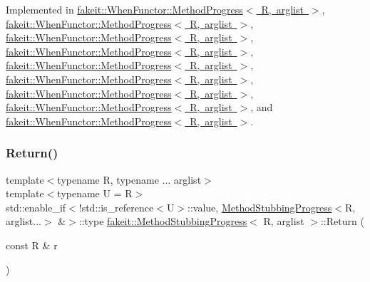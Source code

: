 Implemented in \mbox{\hyperlink{structfakeit_1_1WhenFunctor_1_1MethodProgress_a4b8a947b1514fe715743ee8e65953d9d}{fakeit\+::\+When\+Functor\+::\+Method\+Progress$<$ R, arglist $>$}}, \mbox{\hyperlink{structfakeit_1_1WhenFunctor_1_1MethodProgress_a4b8a947b1514fe715743ee8e65953d9d}{fakeit\+::\+When\+Functor\+::\+Method\+Progress$<$ R, arglist $>$}}, \mbox{\hyperlink{structfakeit_1_1WhenFunctor_1_1MethodProgress_a4b8a947b1514fe715743ee8e65953d9d}{fakeit\+::\+When\+Functor\+::\+Method\+Progress$<$ R, arglist $>$}}, \mbox{\hyperlink{structfakeit_1_1WhenFunctor_1_1MethodProgress_a4b8a947b1514fe715743ee8e65953d9d}{fakeit\+::\+When\+Functor\+::\+Method\+Progress$<$ R, arglist $>$}}, \mbox{\hyperlink{structfakeit_1_1WhenFunctor_1_1MethodProgress_a4b8a947b1514fe715743ee8e65953d9d}{fakeit\+::\+When\+Functor\+::\+Method\+Progress$<$ R, arglist $>$}}, \mbox{\hyperlink{structfakeit_1_1WhenFunctor_1_1MethodProgress_a4b8a947b1514fe715743ee8e65953d9d}{fakeit\+::\+When\+Functor\+::\+Method\+Progress$<$ R, arglist $>$}}, \mbox{\hyperlink{structfakeit_1_1WhenFunctor_1_1MethodProgress_a4b8a947b1514fe715743ee8e65953d9d}{fakeit\+::\+When\+Functor\+::\+Method\+Progress$<$ R, arglist $>$}}, \mbox{\hyperlink{structfakeit_1_1WhenFunctor_1_1MethodProgress_a4b8a947b1514fe715743ee8e65953d9d}{fakeit\+::\+When\+Functor\+::\+Method\+Progress$<$ R, arglist $>$}}, and \mbox{\hyperlink{structfakeit_1_1WhenFunctor_1_1MethodProgress_a4b8a947b1514fe715743ee8e65953d9d}{fakeit\+::\+When\+Functor\+::\+Method\+Progress$<$ R, arglist $>$}}.

\mbox{\label{structfakeit_1_1MethodStubbingProgress_ab97be63c322887db40cb788d28875fea}} 
\subsubsection{\texorpdfstring{Return()}{Return()}\hspace{0.1cm}{\footnotesize\ttfamily [1/45]}}
{\footnotesize\ttfamily template$<$typename R, typename ... arglist$>$ \\
template$<$typename U  = R$>$ \\
std\+::enable\+\_\+if$<$!std\+::is\+\_\+reference$<$U$>$\+::value, \mbox{\hyperlink{structfakeit_1_1MethodStubbingProgress}{Method\+Stubbing\+Progress}}$<$R, arglist...$>$ \&$>$\+::type \mbox{\hyperlink{structfakeit_1_1MethodStubbingProgress}{fakeit\+::\+Method\+Stubbing\+Progress}}$<$ R, arglist $>$\+::Return (\begin{DoxyParamCaption}\item[{const R \&}]{r }\end{DoxyParamCaption})\hspace{0.3cm}{\ttfamily [inline]}}


